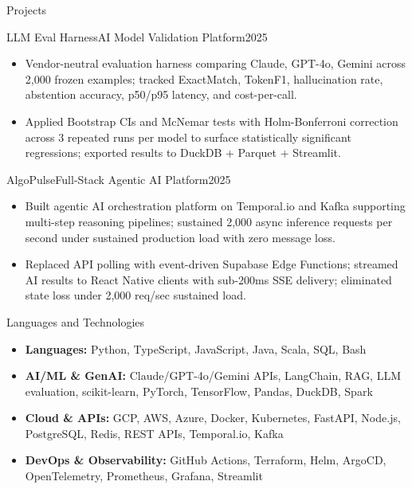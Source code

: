 \documentclass[]{mcdowellcv}
\begin{document}
\begin{cvsection}{Projects}
  \begin{cvsubsection}{LLM Eval Harness}{AI Model Validation Platform}{2025}
    \begin{itemize}
      \item Vendor-neutral evaluation harness comparing Claude, GPT-4o, Gemini across 2,000 frozen examples; tracked ExactMatch, TokenF1, hallucination rate, abstention accuracy, p50/p95 latency, and cost-per-call.
      \item Applied Bootstrap CIs and McNemar tests with Holm-Bonferroni correction across 3 repeated runs per model to surface statistically significant regressions; exported results to DuckDB + Parquet + Streamlit.
    \end{itemize}
    \vspace{-1.5pt}
  \end{cvsubsection}

  \begin{cvsubsection}{AlgoPulse}{Full-Stack Agentic AI Platform}{2025}
    \begin{itemize}
      \item Built agentic AI orchestration platform on Temporal.io and Kafka supporting multi-step reasoning pipelines; sustained 2,000 async inference requests per second under sustained production load with zero message loss.
      \item Replaced API polling with event-driven Supabase Edge Functions; streamed AI results to React Native clients with sub-200ms SSE delivery; eliminated state loss under 2,000 req/sec sustained load.
    \end{itemize}
  \end{cvsubsection}
\end{cvsection}

\begin{cvsection}{Languages and Technologies}
  \begin{cvsubsection}{}{}{}
    \begin{itemize}
      \item \textbf{Languages:} Python, TypeScript, JavaScript, Java, Scala, SQL, Bash
      \item \textbf{AI/ML \& GenAI:} Claude/GPT-4o/Gemini APIs, LangChain, RAG, LLM evaluation, scikit-learn, PyTorch, TensorFlow, Pandas, DuckDB, Spark
      \item \textbf{Cloud \& APIs:} GCP, AWS, Azure, Docker, Kubernetes, FastAPI, Node.js, PostgreSQL, Redis, REST APIs, Temporal.io, Kafka
      \item \textbf{DevOps \& Observability:} GitHub Actions, Terraform, Helm, ArgoCD, OpenTelemetry, Prometheus, Grafana, Streamlit
    \end{itemize}
  \end{cvsubsection}
\end{cvsection}
\end{document}
